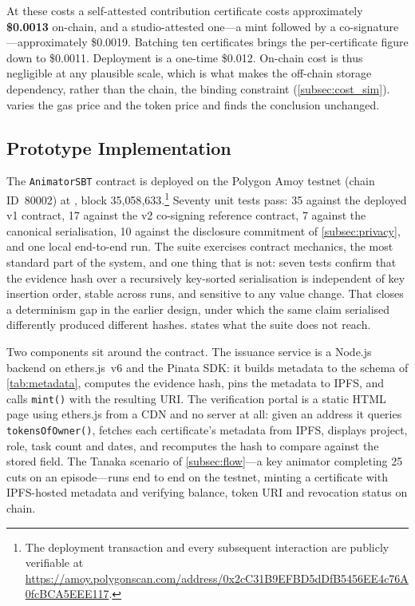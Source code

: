 At these costs a self-attested contribution certificate costs approximately
\textbf{\$0.0013} on-chain, and a studio-attested one---a mint followed by a
co-signature---approximately \$0.0019. Batching ten certificates brings the
per-certificate figure down to \$0.0011. Deployment is a one-time \$0.012.
On-chain cost is thus negligible at any plausible scale, which is what makes the
off-chain storage dependency, rather than the chain, the binding constraint
(\cref{subsec:cost_sim}).  varies the gas price and the
token price and finds the conclusion unchanged.

\subsection{Prototype Implementation}
\label{subsec:prototype}

The \texttt{AnimatorSBT} contract is deployed on the Polygon Amoy testnet (chain
ID~80002) at , block
35{,}058{,}633.\footnote{The deployment transaction and every subsequent interaction are
publicly verifiable at
\url{https://amoy.polygonscan.com/address/0x2cC31B9EFBD5dDfB5456EE4c76A0fcBCA5EEE117}.}
Seventy unit tests pass: 35 against the deployed v1 contract, 17 against the v2
co-signing reference contract, 7 against the canonical serialisation, 10 against the
disclosure commitment of \cref{subsec:privacy}, and one local end-to-end run. The suite
exercises contract mechanics, the most standard part of the system, and one thing that is
not: seven tests confirm that the evidence hash over a recursively key-sorted
serialisation is independent of key insertion order, stable across runs, and sensitive to
any value change. That closes a determinism gap in the earlier design, under which the
same claim serialised differently produced different hashes.
 states what the suite does not reach.

Two components sit around the contract. The issuance service is a Node.js backend on
ethers.js~v6 and the Pinata SDK: it builds metadata to the schema of
\cref{tab:metadata}, computes the evidence hash, pins the metadata to IPFS, and calls
\texttt{mint()} with the resulting URI. The verification portal is a static HTML page
using ethers.js from a CDN and no server at all: given an address it queries
\texttt{tokensOfOwner()}, fetches each certificate's metadata from IPFS, displays
project, role, task count and dates, and recomputes the hash to compare against the
stored field. The Tanaka scenario of \cref{subsec:flow}---a key animator completing 25
cuts on an episode---runs end to end on the testnet, minting a certificate with
IPFS-hosted metadata and verifying balance, token URI and revocation status on chain.

